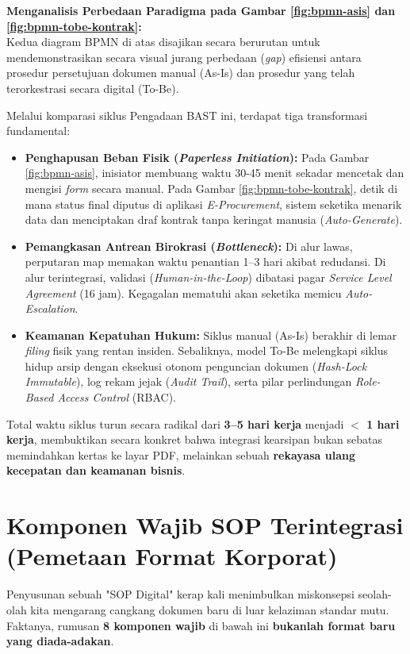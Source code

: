 \documentclass[12pt,a4paper]{report}
\begin{document}
\begin{plnbox}
\small
\textbf{Menganalisis Perbedaan Paradigma pada Gambar \ref{fig:bpmn-asis} dan \ref{fig:bpmn-tobe-kontrak}:} \\
Kedua diagram BPMN di atas disajikan secara berurutan untuk mendemonstrasikan secara visual jurang perbedaan (\textit{gap}) efisiensi antara prosedur persetujuan dokumen manual (As-Is) dan prosedur yang telah terorkestrasi secara digital (To-Be).

Melalui komparasi siklus Pengadaan BAST ini, terdapat tiga transformasi fundamental:
\begin{itemize}[leftmargin=*, nosep]
    \item \textbf{Penghapusan Beban Fisik (\textit{Paperless Initiation}):} Pada Gambar \ref{fig:bpmn-asis}, inisiator membuang waktu 30-45 menit sekadar mencetak dan mengisi \textit{form} secara manual. Pada Gambar \ref{fig:bpmn-tobe-kontrak}, detik di mana status final diputus di aplikasi \textit{E-Procurement}, sistem seketika menarik data dan menciptakan draf kontrak tanpa keringat manusia (\textit{Auto-Generate}).
    \item \textbf{Pemangkasan Antrean Birokrasi (\textit{Bottleneck}):} Di alur lawas, perputaran map memakan waktu penantian 1--3 hari akibat redudansi. Di alur terintegrasi, validasi (\textit{Human-in-the-Loop}) dibatasi pagar \textit{Service Level Agreement} (16 jam). Kegagalan mematuhi akan seketika memicu \textit{Auto-Escalation}.
    \item \textbf{Keamanan Kepatuhan Hukum:} Siklus manual (As-Is) berakhir di lemar \textit{filing} fisik yang rentan insiden. Sebaliknya, model To-Be melengkapi siklus hidup arsip dengan eksekusi otonom penguncian dokumen (\textit{Hash-Lock Immutable}), log rekam jejak (\textit{Audit Trail}), serta pilar perlindungan \textit{Role-Based Access Control} (RBAC).
\end{itemize}
Total waktu siklus turun secara radikal dari \textbf{3--5 hari kerja} menjadi \textbf{$<$ 1 hari kerja}, membuktikan secara konkret bahwa integrasi kearsipan bukan sebatas memindahkan kertas ke layar PDF, melainkan sebuah \textbf{rekayasa ulang kecepatan dan keamanan bisnis}.
\end{plnbox}

\section{Komponen Wajib SOP Terintegrasi (Pemetaan Format Korporat)}
Penyusunan sebuah "SOP Digital" kerap kali menimbulkan miskonsepsi seolah-olah kita mengarang cangkang dokumen baru di luar kelaziman standar mutu. Faktanya, rumusan \textbf{8 komponen wajib} di bawah ini \textbf{bukanlah format baru yang diada-adakan}. 
\end{document}
